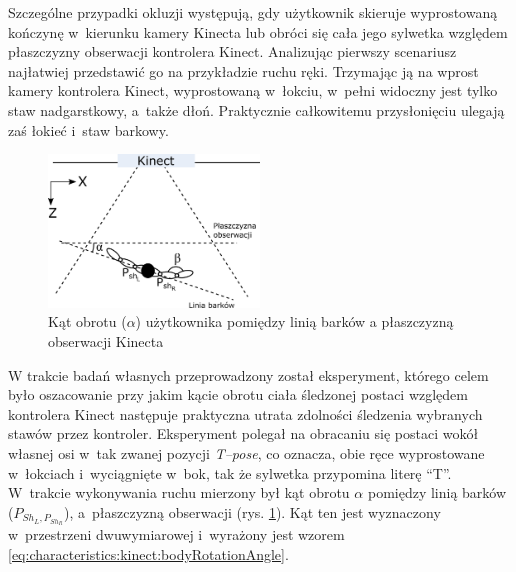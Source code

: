 Szczególne przypadki okluzji występują, gdy użytkownik skieruje wyprostowaną kończynę w~kierunku kamery Kinecta lub obróci się cała jego sylwetka względem płaszczyzny obserwacji kontrolera Kinect. Analizując pierwszy scenariusz najłatwiej przedstawić go na przykładzie ruchu ręki. Trzymając ją na wprost kamery kontrolera Kinect, wyprostowaną w~łokciu, w~pełni widoczny jest tylko staw nadgarstkowy, a~także dłoń. Praktycznie całkowitemu przysłonięciu ulegają zaś łokieć i~staw barkowy. 
																																			
\begin{savenotes}
	\begin{figure}[!htb]
		\centering
		\includegraphics[width=0.5\textwidth]{images/kinectAngle.png}
		\caption{Kąt obrotu ($\alpha$) użytkownika pomiędzy linią barków a płaszczyzną obserwacji Kinecta}
		\label{fig:characteristics:kinect:bodyRotationAngle}
	\end{figure}
\end{savenotes}
																																					
W trakcie badań własnych przeprowadzony został eksperyment, którego celem było oszacowanie przy jakim kącie obrotu ciała śledzonej postaci względem kontrolera Kinect następuje praktyczna utrata zdolności śledzenia wybranych stawów przez kontroler. Eksperyment polegał na obracaniu się postaci wokół własnej osi w~tak zwanej pozycji \emph{T--pose}, co oznacza, obie ręce wyprostowane w~łokciach i~wyciągnięte w~bok, tak że sylwetka przypomina literę "`T"'. W~trakcie wykonywania ruchu mierzony był kąt obrotu $\alpha$ pomiędzy linią barków ($P_{{Sh}_L, P_{{Sh}_R}}$), a~płaszczyzną obserwacji (rys. \ref{fig:characteristics:kinect:bodyRotationAngle}). Kąt ten jest wyznaczony w~przestrzeni dwuwymiarowej i~wyrażony jest wzorem \ref{eq:characteristics:kinect:bodyRotationAngle}.
																																			
